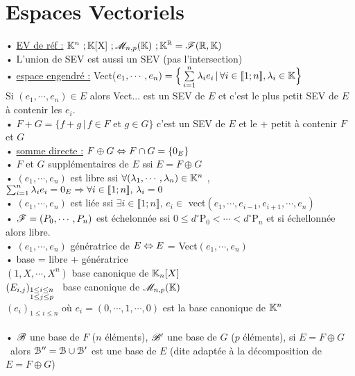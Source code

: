 \documentclass[12 pt]{book}
\begin{document}
\section*{Espaces Vectoriels}

\begin{flushleft}
\begin{doublespace}

	• \underline{EV de réf :} $\mathbb{K}^n \ ; \mathbb{K}[\text{X}] \ ; \mathscr{M}_{n,p}(\mathbb{K}) \ ;\mathbb{K}^{\mathbb{R}} = \mathscr{F}(\mathbb{R}, \mathbb{K})$\\
	• L'union de SEV est aussi un SEV (pas l'intersection)\\
	• \underline{espace engendré :} Vect($e_1,\cdots, e_n) = \Big\{ \sum\limits_{i =1}^n \lambda_i e_i \, | \, \forall i\in \llbracket1;n\rrbracket , \lambda_i \in \mathbb{K} \Big\}$\\
	Si $(e_1,\cdots,e_n)\in E$ alors Vect... est un SEV de $E$ et c'est le plus petit SEV de $E$ à contenir les $e_i$.\\
	• $F + G =\{ f+g \, | \, f\in F$ et $g \in G \}$ \quad c'est un SEV de $E$ et le + petit à contenir $F$ et $G$\\
	• \underline{somme directe :} $F\oplus G \Leftrightarrow F\cap G =\{ 0_E\}$\\
	• $F$ et $G$ supplémentaires de $E$ ssi $E = F\oplus G$\\
	• $(e_1, \cdots, e_n)$ est libre ssi $\forall (\lambda_1,\cdots , \lambda_n) \in \mathbb{K}^n$ , $\sum_{i = 1}^n \lambda_i e_i = 0_E \Rightarrow \forall i\in \llbracket 1;n \rrbracket, \, \lambda_i = 0$\\
	• $(e_1,\cdots , e_n)$ est liée ssi $\exists i \in \llbracket 1;n \rrbracket , \, e_i\in$ vect$(e_1,\cdots , e_{i-1}, e_{i+1}, \cdots , e_n)$\\
	• $\mathscr{F} = (P_0,\cdots , P_n)$ est échelonnée ssi $0\leq d^\circ \text{P}_0 < \cdots < d^\circ \text{P}_n$ et si échellonnée alors libre.\\
	• $(e_1,\cdots , e_n)$ génératrice de $E \Leftrightarrow E$ = Vect$(e_1,\cdots ,e_n)$\\
	• base = libre + génératrice\\
	\qquad $(1,X, \cdots, X^n )$ base canonique de $\mathbb{K}_n[X]$\\
	\qquad $(E_{i,j} )_{\begin{subarray}{l}1\leq i \leq n\\ 1\leq j \leq p \end{subarray}}$ \, base canonique de $\mathscr{M}_{n,p}(\mathbb{K})$\\
	\qquad $(e_i)_{1\leq i \leq n}$ où $e_i=(0, \cdots , 1, \cdots , 0)$ est la base canonique de $\mathbb{K}^n$\\
	
	\text{ }\\
	• $\mathscr{B}$ une base de $F$ ($n$ éléments), $\mathscr{B}'$ une base de $G$ ($p$ éléments), si $E = F\oplus G$\\
	\ alors $\mathcal{B}'' = \mathcal{B} \cup \mathcal{B}'$ est une base de $E$ (dite adaptée à la décomposition de $E = F\oplus G$)\\

\end{doublespace}
\end{flushleft}
\end{document}
